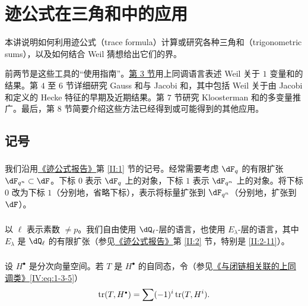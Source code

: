 
\chapter[{迹公式在三角和中的应用 [Sommes trig.]}]{迹公式在三角和中的应用}\label{VI}

本讲说明如何利用迹公式（trace formula）计算或研究各种三角和（trigonometric sums），以及如何结合 Weil 猜想给出它们的界。

前两节是这些工具的“使用指南”。\hyperref[VI:3]{第 3 节}用上同调语言表述 Weil 关于 $1$ 变量和的结果。第 $4$ 至 $6$ 节详细研究 Gauss 和与 Jacobi 和，其中包括 Weil 关于由 Jacobi 和定义的 Hecke 特征的早期及近期结果。第 $7$ 节研究 Kloosterman 和的多变量推广。最后，第 $8$ 节简要介绍这些方法已经得到或可能得到的其他应用。



\section*{记号}\label{VI:0}

\subsection{}\label{VI:0-1}

我们沿用\hyperref[II]{《迹公式报告》}第 \ref{II:1} 节的记号。经常需要考虑 $\dF_q$ 的有限扩张 $\dF_{q^n}\subset \dF$。下标 $0$ 表示 $\dF_q$ 上的对象，下标 $1$ 表示 $\dF_{q^n}$ 上的对象。将下标 $0$ 改为下标 $1$（分别地，省略下标），表示将标量扩张到 $\dF_{q^n}$（分别地，扩张到 $\dF$）。

\subsection{}\label{VI:0-2}

以 $\ell$ 表示素数 $\ne p$。我们自由使用 $\dQ_\ell$-层的语言，也使用 $E_\lambda$-层的语言，其中 $E_\lambda$ 是 $\dQ_\ell$ 的有限扩张（参见\hyperref[II]{《迹公式报告》}第 \ref{II:2} 节，特别是 \ref{II:2-11}）。

\subsection{}\label{VI:0-3}

设 $H^\bullet$ 是分次向量空间。若 $T$ 是 $H^\bullet$ 的自同态，令（参见\hyperref[IV]{《与闭链相关联的上同调类》}\ref{IV:eq:1-3-5}）
\[
  \tr(T,H^\bullet) = \sum (-1)^i \tr(T,H^i) \text{.}
\]

